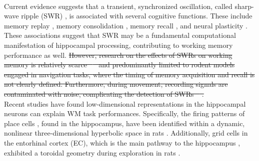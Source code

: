 \documentclass[final,3p,times,twocolumn]{elsarticle}
\providecommand{\DIFdeltex}[1]{{\protect\color{red}\sout{#1}}}                      %
\providecommand{\DIFaddbegin}{} %
\providecommand{\DIFdelbegin}{} %
\providecommand{\DIFdelend}{} %
\providecommand{\DIFdel}[1]{\texorpdfstring{\DIFdeltex{#1}}{}} %
\newcommand{\DIFscaledelfig}{0.5}
\newlength{\DIFdelgraphicswidth} %
\newlength{\DIFdelgraphicsheight} %
\newcommand{\DIFaddincludegraphics}[2][]{{\color{blue}\fbox{\DIFOincludegraphics[#1]{#2}}}} %
\newcommand{\DIFdelincludegraphics}[2][]{%
\sbox{\DIFdelgraphicsbox}{\DIFOincludegraphics[#1]{#2}}%
\settoboxwidth{\DIFdelgraphicswidth}{\DIFdelgraphicsbox} %
\settoboxtotalheight{\DIFdelgraphicsheight}{\DIFdelgraphicsbox} %
\scalebox{\DIFscaledelfig}{%
\parbox[b]{\DIFdelgraphicswidth}{\usebox{\DIFdelgraphicsbox}\\[-\baselineskip] \rule{\DIFdelgraphicswidth}{0em}}\llap{\resizebox{\DIFdelgraphicswidth}{\DIFdelgraphicsheight}{%
\setlength{\unitlength}{\DIFdelgraphicswidth}%
\begin{picture}(1,1)%
\thicklines\linethickness{2pt} %
{\color[rgb]{1,0,0}\put(0,0){\framebox(1,1){}}}%
{\color[rgb]{1,0,0}\put(0,0){\line( 1,1){1}}}%
{\color[rgb]{1,0,0}\put(0,1){\line(1,-1){1}}}%
\end{picture}%
}\hspace*{3pt}}} %
} %
\DeclareRobustCommand{\DIFaddbegin}{\DIFOaddbegin \let\includegraphics\DIFaddincludegraphics} %
\DeclareRobustCommand{\DIFdelbegin}{\DIFOdelbegin \let\includegraphics\DIFdelincludegraphics} %
\DeclareRobustCommand{\DIFdelend}{\DIFOaddend \let\includegraphics\DIFOincludegraphics} %
\begin{document}
\DIFdelend \\
\indent
Current evidence suggests that a transient, synchronized oscillation, called sharp-wave ripple (SWR) \cite{buzsaki_hippocampal_2015}, is associated with several cognitive functions. These include memory replay \cite{wilson_reactivation_1994} \cite{nadasdy_replay_1999} \cite{lee_memory_2002} \cite{diba_forward_2007} \cite{davidson_hippocampal_2009}, memory consolidation \cite{girardeau_selective_2009} \cite{ego-stengel_disruption_2010} \cite{fernandez-ruiz_long-duration_2019} \cite{kim_corticalhippocampal_2022}, memory recall \cite{wu_hippocampal_2017} \cite{norman_hippocampal_2019} \cite{norman_hippocampal_2021}, and neural plasticity \cite{behrens_induction_2005} \cite{norimoto_hippocampal_2018}. These associations suggest that SWR may be a fundamental computational manifestation of hippocampal processing, contributing to working memory performance as well.
\DIFdelbegin \DIFdel{However, research on the effects of SWRs on working memory is relatively scarce \mbox{%
\cite{jadhav_awake_2012} }\hspace{0pt}%
and predominantly limited to rodent models engaged in navigation tasks, where the timing of memory acquisition and recall is not clearly defined. Furthermore, during movement, recording signals are contaminated with noise, complicating the detection of SWRs \mbox{%
\cite{Watanabe_2021}}\hspace{0pt}%
.
}\DIFdelend \\
\indent
Recent studies have found low-dimensional representations in the hippocampal neurons can explain WM task performances. Specifically, the firing patterns of place cells \cite{okeefe_hippocampus_1971} \cite{okeefe_place_1976} \cite{ekstrom_cellular_2003} \cite{kjelstrup_finite_2008} \cite{harvey_intracellular_2009}, found in the hippocampus, have been identified within a dynamic, nonlinear three-dimensional hyperbolic space in rats \cite{zhang_hippocampal_2022}. Additionally, grid cells in the entorhinal cortex (EC), which is the main pathway to the hippocampus \cite{naber_reciprocal_2001} \cite{van_strien_anatomy_2009} \cite{strange_functional_2014}, exhibited a toroidal geometry during exploration in rats \cite{gardner_toroidal_2022}.
\DIFaddbegin \\
\indent
\end{document}
